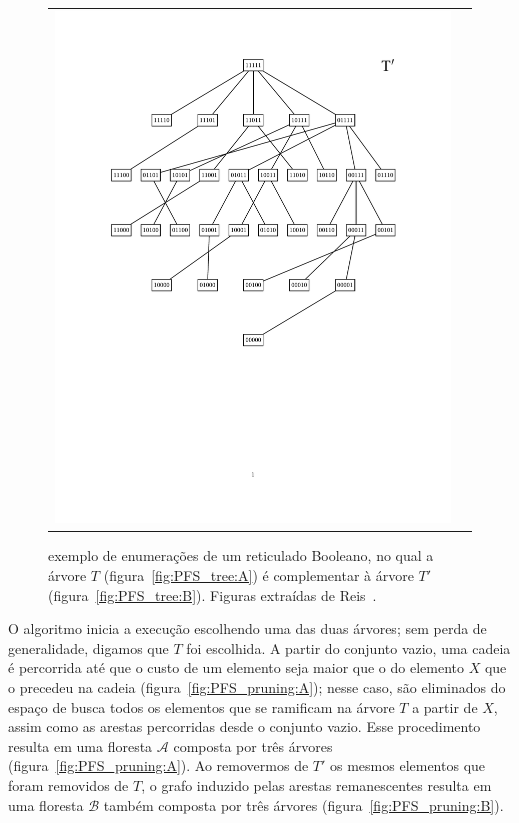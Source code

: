 \documentclass[12pt]{article}
\begin{document}
\begin{figure}[h]
\begin{tabular}{c c}
{{    \includegraphics[trim=3cm 8.5cm 1.2cm 2cm, clip=true]{PFS_tree_B.pdf}}
    \label{fig:PFS_tree:B} }
  \end{tabular}
  \caption{exemplo de enumerações de um reticulado Booleano, no qual a
árvore $T$ (figura~\ref{fig:PFS_tree:A}) é complementar à árvore $T'$
(figura~\ref{fig:PFS_tree:B}). Figuras extraídas de Reis~\cite{msreis thesis}.}
  \label{fig:PFS_tree} 
\end{figure}

O algoritmo inicia a execução escolhendo uma das duas árvores; sem perda de generalidade, digamos que $T$ foi escolhida. A partir
do conjunto vazio, uma cadeia é percorrida até que o custo de um elemento seja maior que o do elemento $X$ que o precedeu na cadeia (figura~\ref{fig:PFS_pruning:A}); nesse caso, são eliminados do espaço de busca todos os elementos que se ramificam na árvore $T$ a partir de $X$, assim como as arestas percorridas desde o conjunto vazio. Esse procedimento resulta em uma floresta $\mathcal{A}$ composta por três árvores (figura~\ref{fig:PFS_pruning:A}). Ao removermos de $T'$ os mesmos elementos que foram removidos de $T$, o grafo induzido pelas arestas remanescentes resulta em uma floresta $\mathcal{B}$ também composta por três árvores (figura~\ref{fig:PFS_pruning:B}).
\end{document}
